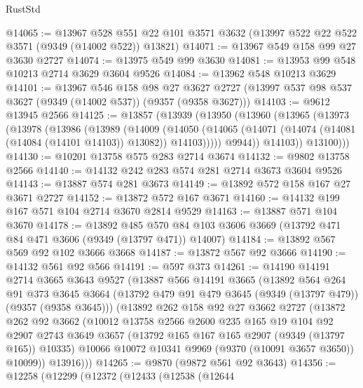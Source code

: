 \begin{lexlean}{RustStd}
\begin{coremodule}
@14065 := @13967
    @528
    @551
    @22
    @101
    @3571
    @3632
    (@13997 @522 @22 @522 @3571 (@9349 (@14002 @522)) @13821)
@14071 := @13967 @549 @158 @99 @27 @3630 @2727
@14074 := @13975 @549 @99 @3630
@14081 := @13953 @99 @548 @10213 @2714 @3629 @3604 @9526
@14084 := @13962 @548 @10213 @3629
@14101 := @13967
    @546
    @158
    @98
    @27
    @3627
    @2727
    (@13997 @537 @98 @537 @3627 (@9349 (@14002 @537)) (@9357 (@9358 @3627)))
@14103 := @9612 @13945 @2566
@14125 := @13857
    (@13939
      (@13950
        (@13960
          (@13965
            (@13973
              (@13978
                (@13986
                  (@13989
                    (@14009
                      (@14050
                        (@14065
                          (@14071 (@14074 (@14081 (@14084 (@14101 @14103)) @13082)) @14103)))))
                  @9944))
              @14103))
          @13100)))
@14130 := @10201 @13758 @575 @283 @2714 @3674
@14132 := @9802 @13758 @2566
@14140 := @14132 @242 @283 @574 @281 @2714 @3673 @3604 @9526
@14143 := @13887 @574 @281 @3673
@14149 := @13892 @572 @158 @167 @27 @3671 @2727
@14152 := @13872 @572 @167 @3671
@14160 := @14132 @199 @167 @571 @104 @2714 @3670 @2814 @9529
@14163 := @13887 @571 @104 @3670
@14178 := @13892
    @485
    @570
    @84
    @103
    @3606
    @3669
    (@13792 @471 @84 @471 @3606 (@9349 (@13797 @471)) @14007)
@14184 := @13892 @567 @569 @92 @102 @3666 @3668
@14187 := @13872 @567 @92 @3666
@14190 := @14132 @561 @92 @566
@14191 := @597 @373
@14261 := @14190
    @14191
    @2714
    @3665
    @3643
    @9527
    (@13887
      @566
      @14191
      @3665
      (@13892
        @564
        @264
        @91
        @373
        @3645
        @3664
        (@13792 @479 @91 @479 @3645 (@9349 (@13797 @479)) (@9357 (@9358 @3645)))
        (@13892
          @262
          @158
          @92
          @27
          @3662
          @2727
          (@13872
            @262
            @92
            @3662
            (@10012
              @13758
              @2566
              @2600
              @235
              @165
              @19
              @104
              @92
              @2907
              @2743
              @3649
              @3657
              (@13792 @165 @167 @165 @2907 (@9349 (@13797 @165)) @10335)
              @10066
              @10072
              @10341
              @9969
              (@9370 (@10091 @3657 @3650))
              @10099))
          @13916)))
@14265 := @9870 (@9872 @561 @92 @3643)
@14356 := @12258
    (@12299
      (@12372
        (@12433
          (@12538
            (@12644

\end{coremodule}
\end{lexlean}
